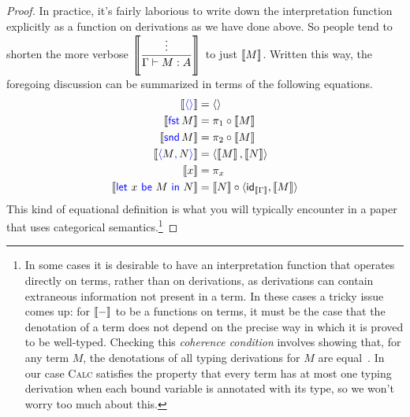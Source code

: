 \begin{proof}
  In practice, it's fairly laborious to write down
  the interpretation function explicitly as a function
  on derivations as we have done above.
  So people tend to shorten the more verbose
  \(\left\llbracket \dfrac{\vdots}{\Gamma\vdash M : A}\right\rrbracket\)
  to just
  \(\left\llbracket M\right\rrbracket\). Written this way, the foregoing discussion
  can be summarized in terms of the following
  equations.
  \begin{align*}
    \llbr{\plunit} &= \angled{} \\
    \llbr{\plfst{M}} &= \pi_1 \circ \llbr{M} \\
    \llbr{\plsnd{M}} &= \pi_2 \circ \llbr{M} \\
    \llbr{\plpair{M}{N}} &= \angled{\llbr{M},\llbr{N}} \\
    \llbr{x} &= \pi_x \\
    \llbr{\pllet{x}{M}{N}} &=
      \llbr{N} \circ \angled{\idt_{\llbr{\Gamma}},\llbr{M}}
  \end{align*}
  This kind of equational definition is what you will typically encounter in a paper
  that uses categorical semantics.\footnote{%
  In some cases it is desirable
  to have an interpretation function that operates
  directly on terms,
  rather than on derivations,
  as derivations can contain extraneous information
  not present in a term.
  In these cases a tricky issue comes up:
  for \(\left\llbracket -\right\rrbracket\) to be a functions on terms,
  it must be the case that
  the denotation of a term does not depend on
  the precise way in which it is proved to be well-typed.
  Checking this \emph{coherence condition}
  involves showing that, for any term \(M\),
  the denotations of all typing derivations
  for \(M\) are equal~\citep{reynolds1991coherence}.
  In our case \textsc{Calc} satisfies the property that every term has at most one typing derivation
  when each bound variable is annotated with its type,
  so we won't worry too much about this.
}


\end{proof}
